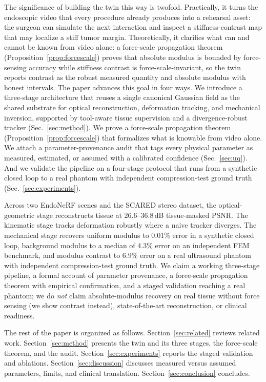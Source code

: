 \documentclass[review]{elsarticle}
\begin{document}
The significance of building the twin this way is twofold. Practically, it
turns the endoscopic video that every procedure already produces into a
rehearsal asset: the surgeon can simulate the next interaction and inspect
a stiffness-contrast map that may localize a stiff tumor margin.
Theoretically, it clarifies what can and cannot be known from video alone:
a force-scale propagation theorem (Proposition~\ref{prop:forcescale})
proves that absolute modulus is bounded by force-sensing accuracy while
stiffness contrast is force-scale-invariant, so the twin reports contrast
as the robust measured quantity and absolute modulus with honest intervals.
The paper advances this goal in four ways. We introduce a three-stage
architecture that reuses a single canonical Gaussian field as the shared
substrate for optical reconstruction, deformation tracking, and mechanical
inversion, supported by tool-aware tissue supervision and a
divergence-robust tracker (Sec.~\ref{sec:method}). We prove a force-scale
propagation theorem (Proposition~\ref{prop:forcescale}) that formalizes
what is knowable from video alone. We attach a parameter-provenance audit
that tags every physical parameter as measured, estimated, or assumed with
a calibrated confidence (Sec.~\ref{sec:uq}). And we validate the pipeline
on a four-stage protocol that runs from a synthetic closed loop to a real
phantom with independent compression-test ground truth
(Sec.~\ref{sec:experiments}).

Across two EndoNeRF scenes and the SCARED stereo dataset, the
optical-geometric stage reconstructs tissue at 26.6--36.8\,dB tissue-masked
PSNR. The kinematic stage tracks deformation robustly where a naive tracker
diverges. The mechanical stage recovers uniform modulus to 0.01\% error in a
synthetic closed loop, background modulus to a median of 4.3\% error on an
independent FEM benchmark, and modulus contrast to 6.9\% error on a real
ultrasound phantom with independent compression-test ground truth. We claim
a working three-stage pipeline, a formal account of parameter provenance, a
force-scale propagation theorem with empirical confirmation, and a
staged validation reaching a real phantom; we do \emph{not} claim
absolute-modulus recovery on real tissue without force sensing (we show
contrast instead), state-of-the-art reconstruction, or clinical readiness.

The rest of the paper is organized as follows. Section~\ref{sec:related}
reviews related work. Section~\ref{sec:method} presents the twin and its
three stages, the force-scale theorem, and the audit.
Section~\ref{sec:experiments} reports the staged validation and ablations.
Section~\ref{sec:discussion} discusses measured versus assumed parameters,
limits, and clinical translation. Section~\ref{sec:conclusion} concludes.
\end{document}
